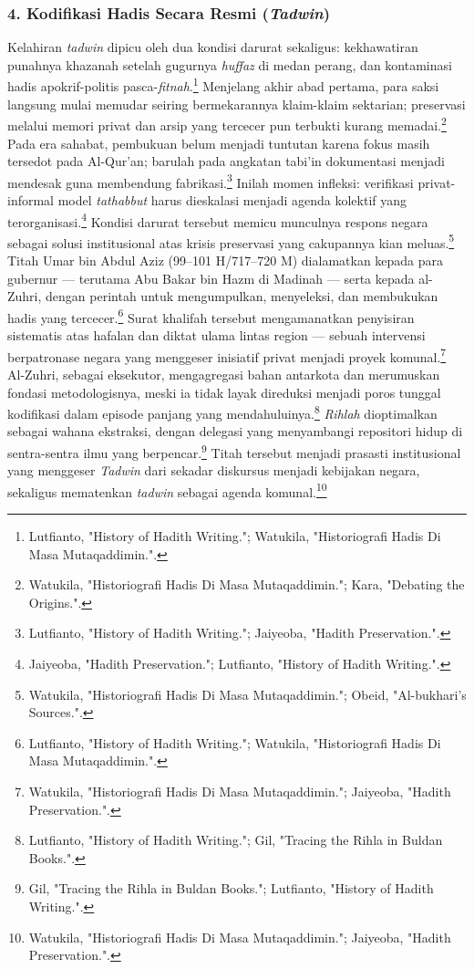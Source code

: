 \subsubsection*{4. Kodifikasi Hadis Secara Resmi (\textit{Tadwin})}

Kelahiran \textit{tadwin} dipicu oleh dua kondisi darurat sekaligus: kekhawatiran punahnya khazanah setelah gugurnya \textit{huffaz} di medan perang, dan kontaminasi hadis apokrif-politis pasca-\textit{fitnah}.\footnote{Lutfianto, "History of Hadith Writing."; Watukila, "Historiografi Hadis Di Masa Mutaqaddimin.".} Menjelang akhir abad pertama, para saksi langsung mulai memudar seiring bermekarannya klaim-klaim sektarian; preservasi melalui memori privat dan arsip yang tercecer pun terbukti kurang memadai.\footnote{Watukila, "Historiografi Hadis Di Masa Mutaqaddimin."; Kara, "Debating the Origins.".} Pada era sahabat, pembukuan belum menjadi tuntutan karena fokus masih tersedot pada Al-Qur'an; barulah pada angkatan tabi'in dokumentasi menjadi mendesak guna membendung fabrikasi.\footnote{Lutfianto, "History of Hadith Writing."; Jaiyeoba, "Hadith Preservation.".} Inilah momen infleksi: verifikasi privat-informal model \textit{tathabbut} harus dieskalasi menjadi agenda kolektif yang terorganisasi.\footnote{Jaiyeoba, "Hadith Preservation."; Lutfianto, "History of Hadith Writing.".} Kondisi darurat tersebut memicu munculnya respons negara sebagai solusi institusional atas krisis preservasi yang cakupannya kian meluas.\footnote{Watukila, "Historiografi Hadis Di Masa Mutaqaddimin."; Obeid, "Al-bukhari's Sources.".} Titah Umar bin Abdul Aziz (99--101 H/717--720 M) dialamatkan kepada para gubernur --- terutama Abu Bakar bin Hazm di Madinah --- serta kepada al-Zuhri, dengan perintah untuk mengumpulkan, menyeleksi, dan membukukan hadis yang tercecer.\footnote{Lutfianto, "History of Hadith Writing."; Watukila, "Historiografi Hadis Di Masa Mutaqaddimin.".} Surat khalifah tersebut mengamanatkan penyisiran sistematis atas hafalan dan diktat ulama lintas region --- sebuah intervensi berpatronase negara yang menggeser inisiatif privat menjadi proyek komunal.\footnote{Watukila, "Historiografi Hadis Di Masa Mutaqaddimin."; Jaiyeoba, "Hadith Preservation.".} Al-Zuhri, sebagai eksekutor, mengagregasi bahan antarkota dan merumuskan fondasi metodologisnya, meski ia tidak layak direduksi menjadi poros tunggal kodifikasi dalam episode panjang yang mendahuluinya.\footnote{Lutfianto, "History of Hadith Writing."; Gil, "Tracing the Rihla in Buldan Books.".} \textit{Rihlah} dioptimalkan sebagai wahana ekstraksi, dengan delegasi yang menyambangi repositori hidup di sentra-sentra ilmu yang berpencar.\footnote{Gil, "Tracing the Rihla in Buldan Books."; Lutfianto, "History of Hadith Writing.".} Titah tersebut menjadi prasasti institusional yang menggeser \textit{Tadwin} dari sekadar diskursus menjadi kebijakan negara, sekaligus mematenkan \textit{tadwin} sebagai agenda komunal.\footnote{Watukila, "Historiografi Hadis Di Masa Mutaqaddimin."; Jaiyeoba, "Hadith Preservation.".}

